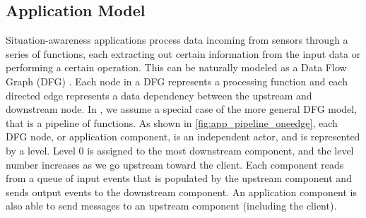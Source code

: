 \subsection{Application Model}
\label{sec:oneedge_app_model}
Situation-awareness applications process data incoming from sensors through a series of functions, each extracting out certain information from the input data or performing a certain operation. This can be naturally modeled as a Data Flow Graph (DFG) \cite{dfg}. Each node in a DFG represents a processing function and each directed edge represents a data dependency between the upstream and downstream node. In \oneedge{}, we assume a special case of the more general DFG model, that is a pipeline of functions. As shown in \cref{fig:app_pipeline_oneedge}, each DFG node, or application component, is an independent actor, and is represented by a level. Level 0 is assigned to the most downstream component, and the level number increases as we go upstream toward the client. Each component reads from a queue of input events that is populated by the upstream component and sends output events to the downstream component. An application component is also able to send messages to an upstream component (including the client).

